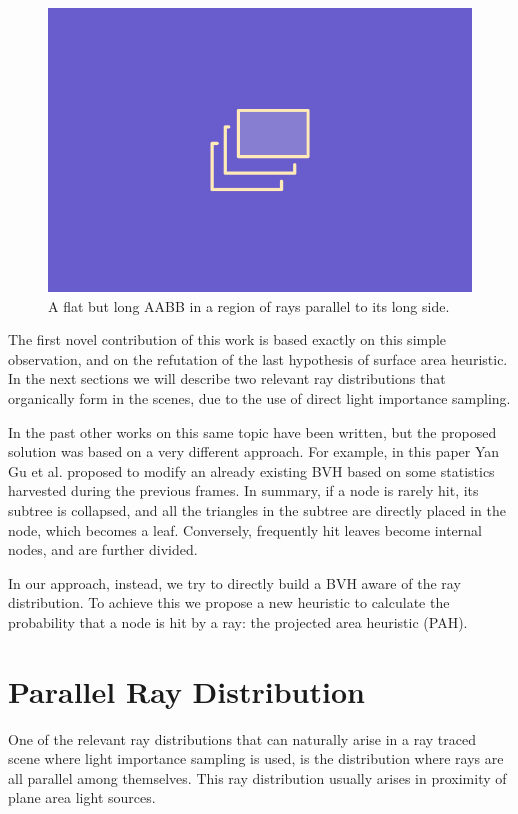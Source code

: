 \documentclass{PoliMi_MasterThesis}
\begin{document}
\begin{figure}[H]
    \centering
    \includegraphics[width=\textwidth*\real{0.5}]{Images/TODO.png}
    \caption{A flat but long AABB in a region of rays parallel to its long side.}
    \label{fig:flat_long_aabb}
\end{figure}

The first novel contribution of this work is based exactly on this simple observation, and on the refutation of the last hypothesis of surface area heuristic. In the next sections we will describe two relevant ray distributions that organically form in the scenes, due to the use of direct light importance sampling.

In the past other works on this same topic have been written, but the proposed solution was based on a very different approach. For example, in this paper \cite{distribution_aware_bvhs} Yan Gu et al. proposed to modify an already existing BVH based on some statistics harvested during the previous frames. In summary, if a node is rarely hit, its subtree is collapsed, and all the triangles in the subtree are directly placed in the node, which becomes a leaf. Conversely, frequently hit leaves become internal nodes, and are further divided.

In our approach, instead, we try to directly build a BVH aware of the ray distribution. To achieve this we propose a new heuristic to calculate the probability that a node is hit by a ray: the projected area heuristic (PAH).

\section{Parallel Ray Distribution} \label{sec:parallel_ray_distribution}
One of the relevant ray distributions that can naturally arise in a ray traced scene where light importance sampling is used, is the distribution where rays are all parallel among themselves. This ray distribution usually arises in proximity of plane area light sources.
\end{document}
